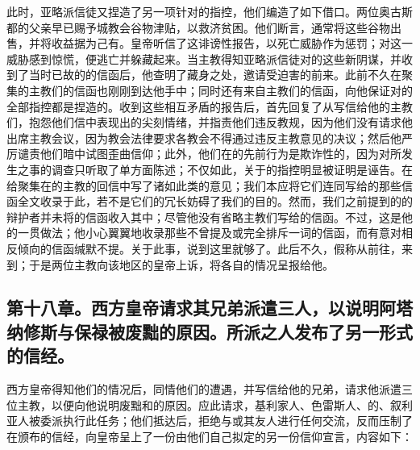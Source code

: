 此时，亚略派信徒又捏造了另一项针对的指控，他们编造了如下借口。两位奥古斯都的父亲早已赐予城教会谷物津贴，以救济贫困。他们断言，通常将这些谷物出售，并将收益据为己有。皇帝听信了这诽谤性报告，以死亡威胁作为惩罚；对这一威胁感到惊慌，便逃亡并躲藏起来。当主教得知亚略派信徒对的这些新阴谋，并收到了当时已故的的信函后，他查明了藏身之处，邀请受迫害的前来。此前不久在聚集的主教们的信函也刚刚到达他手中；同时还有来自主教们的信函，向他保证对的全部指控都是捏造的。收到这些相互矛盾的报告后，首先回复了从写信给他的主教们，抱怨他们信中表现出的尖刻情绪，并指责他们违反教规，因为他们没有请求他出席主教会议，因为教会法律要求各教会不得通过违反主教意见的决议；然后他严厉谴责他们暗中试图歪曲信仰；此外，他们在的先前行为是欺诈性的，因为对所发生之事的调查只听取了单方面陈述；不仅如此，关于的指控明显被证明是诬告。在给聚集在的主教的回信中写了诸如此类的意见；我们本应将它们连同写给的那些信函全文收录于此，若不是它们的冗长妨碍了我们的目的。然而，我们之前提到的的辩护者并未将的信函收入其中；尽管他没有省略主教们写给的信函。不过，这是他的一贯做法；他小心翼翼地收录那些不曾提及或完全排斥一词的信函，而有意对相反倾向的信函缄默不提。关于此事，说到这里就够了。此后不久，假称从前往，来到；于是两位主教向该地区的皇帝上诉，将各自的情况呈报给他。\par


\subsection{第十八章。西方皇帝请求其兄弟派遣三人，以说明阿塔纳修斯与保禄被废黜的原因。所派之人发布了另一形式的信经。}

西方皇帝得知他们的情况后，同情他们的遭遇，并写信给他的兄弟，请求他派遣三位主教，以便向他说明废黜和的原因。应此请求，基利家人、色雷斯人、的、叙利亚人被委派执行此任务；他们抵达后，拒绝与或其友人进行任何交流，反而压制了在颁布的信经，向皇帝呈上了一份由他们自己拟定的另一份信仰宣言，内容如下：\par

